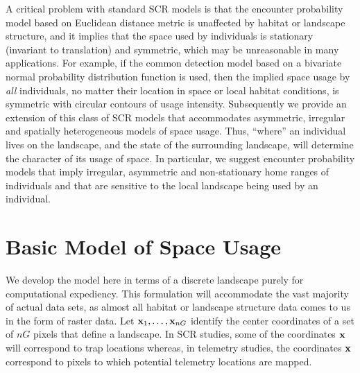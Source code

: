\documentclass[12pt]{article}
\begin{document}
A critical problem with standard SCR models
is that the encounter probability model based on Euclidean
distance metric is unaffected by habitat or landscape structure, and
it implies that the space used by individuals is stationary (invariant
to translation) and symmetric,
which may be unreasonable in many applications.  For example, if the
common detection model based on a bivariate normal probability
distribution function is used, then the implied space usage by {\it
  all} individuals, no matter their location in space or local habitat
conditions, is symmetric with circular contours of usage intensity.
Subsequently we provide an extension
of this class of SCR models that accommodates asymmetric, irregular
and spatially heterogeneous models of space usage.
 Thus, ``where'' an individual lives on the landscape, and
the state of the surrounding landscape, will determine the character
of its usage of space. In particular, we suggest encounter probability
models that
imply irregular, asymmetric and non-stationary home ranges of
individuals and that are sensitive to the local landscape being used
by an individual.

\section{Basic Model of Space Usage}
\label{rsf.sec.rsfmodel}

We develop the model here in terms of a discrete landscape purely for
computational expediency. This formulation will accommodate the vast
majority of actual data sets, as
almost all habitat or landscape structure data comes to us in the form
of raster data.  Let ${\bf x}_{1},\ldots,{\bf x}_{nG}$ identify the
center coordinates of a set of $nG$ pixels that define a landscape.
In SCR
studies, some of the coordinates ${\bf x}$ will correspond to trap
locations whereas, in telemetry studies, the coordinates ${\bf x}$
correspond to pixels to which potential telemetry locations are
mapped.
\end{document}
